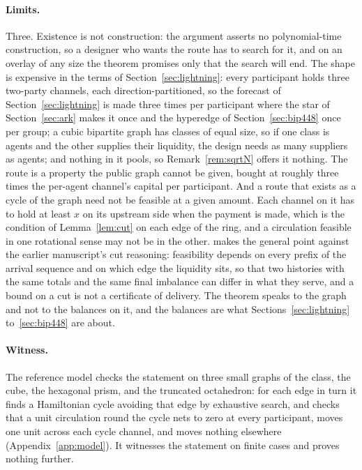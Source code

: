\documentclass[11pt]{article}
\theoremstyle{plain}
\theoremstyle{definition}
\theoremstyle{remark}
\begin{document}
\paragraph{Limits.} Three. Existence is not construction: the argument asserts no polynomial-time construction, so a designer who wants the route has to search for it, and on an overlay of any size the theorem promises only that the search will end. The shape is expensive in the terms of Section~\ref{sec:lightning}: every participant holds three two-party channels, each direction-partitioned, so the forecast of Section~\ref{sec:lightning} is made three times per participant where the star of Section~\ref{sec:ark} makes it once and the hyperedge of Section~\ref{sec:bip448} once per group; a cubic bipartite graph has classes of equal size, so if one class is agents and the other supplies their liquidity, the design needs as many suppliers as agents; and nothing in it pools, so Remark~\ref{rem:sqrtN} offers it nothing. The route is a property the public graph cannot be given, bought at roughly three times the per-agent channel's capital per participant. And a route that exists as a cycle of the graph need not be feasible at a given amount. Each channel on it has to hold at least $x$ on its upstream side when the payment is made, which is the condition of Lemma~\ref{lem:cut} on each edge of the ring, and a circulation feasible in one rotational sense may not be in the other. \citet{dugan2026trial} makes the general point against the earlier manuscript's cut reasoning: feasibility depends on every prefix of the arrival sequence and on which edge the liquidity sits, so that two histories with the same totals and the same final imbalance can differ in what they serve, and a bound on a cut is not a certificate of delivery. The theorem speaks to the graph and not to the balances on it, and the balances are what Sections~\ref{sec:lightning} to~\ref{sec:bip448} are about.

\paragraph{Witness.} The reference model checks the statement on three small graphs of the class, the cube, the hexagonal prism, and the truncated octahedron: for each edge in turn it finds a Hamiltonian cycle avoiding that edge by exhaustive search, and checks that a unit circulation round the cycle nets to zero at every participant, moves one unit across each cycle channel, and moves nothing elsewhere (Appendix~\ref{app:model}). It witnesses the statement on finite cases and proves nothing further.
\end{document}
